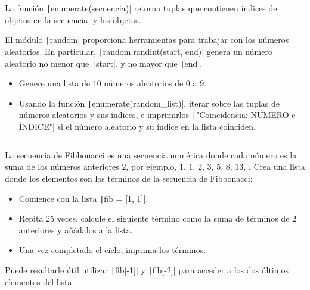 \begin{questions}
	La función \texttt|enumerate(secuencia)| retorna
	tuplas que contienen índices de objetos en la secuencia, y los
	objetos.

	El módulo \texttt|random| proporciona herramientas para
	trabajar con los números aleatorios.
	En particular, \texttt|random.randint(start, end)|
	genera un número aleatorio no menor que
	\texttt|start|, y no mayor que \texttt|end|.

	\begin{itemize}
		\item

		      Genere una lista de $10$ números aleatorios de $0$ a $9$.

		\item

		      Usando la función \texttt|enumerate(random_list)|,
		      iterar sobre las tuplas de números aleatorios y sus índices,
		      e imprimirlos \texttt|"Coincidencia: NÚMERO e ÍNDICE"|
		      si el número aleatorio y su índice en la lista coinciden.
	\end{itemize}
	\inputminted[fontsize=\tiny,linenos]{python}{q3.py}

	\question

	La secuencia de Fibbonacci es una secuencia numérica donde cada
	número es la suma de los números anteriores $2$, por ejemplo,
	$1$, $1$, $2$, $3$, $5$, $8$, $13$, \lpuntos.
	Crea una lista donde los elementos son los términos de la secuencia
	de Fibbonacci:
	\begin{itemize}
		\item

		      Comience con la lista \texttt|fib = [1, 1]|.

		\item

		      Repita $25$ veces, calcule el siguiente término como la suma de
		      términos de $2$ anteriores y añádalos a la lista.

		\item

		      Una vez completado el ciclo, imprima los términos.
	\end{itemize}
	Puede resultarle útil utilizar \texttt|fib[-1]| y
	\texttt|fib[-2]| para acceder a los dos últimos elementos del
	lista.

	\question


\end{questions}
